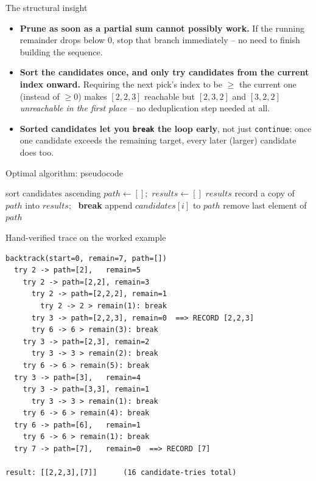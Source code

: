 \documentclass[11pt,aspectratio=169]{beamer}
\begin{document}
\begin{frame}{The structural insight}
  \begin{itemize}
    \item \textbf{Prune as soon as a partial sum cannot possibly work.} If the running
    remainder drops below $0$, stop that branch immediately -- no need to finish
    building the sequence.
    \item \textbf{Sort the candidates once, and only try candidates from the current
    index onward.} Requiring the next pick's index to be $\ge$ the current one
    (instead of $\ge 0$) makes $[2,2,3]$ reachable but $[2,3,2]$ and $[3,2,2]$
    \emph{unreachable in the first place} -- no deduplication step needed at all.
    \item \textbf{Sorted candidates let you \texttt{break} the loop early}, not just
    \texttt{continue}: once one candidate exceeds the remaining target, every later
    (larger) candidate does too.
  \end{itemize}
\end{frame}

\begin{frame}{Optimal algorithm: pseudocode}
  \footnotesize
  \begin{algorithmic}[1]
      \State sort candidates ascending
      \State $path \gets []$;\ $results \gets []$
      \State {}
      \State \Return $results$
    \EndFunction
       record a copy of $path$ into $results$;\ \Return \EndIf
         \textbf{break} \EndIf
        \State append $candidates[i]$ to $path$
        \State {} 
        \State remove last element of $path$
      \EndFor
    \EndFunction
  \end{algorithmic}
\end{frame}

\begin{frame}[fragile]{Hand-verified trace on the worked example}
  \begin{lstlisting}[style=py,numbers=none,aboveskip=0pt,belowskip=0pt]
backtrack(start=0, remain=7, path=[])
  try 2 -> path=[2],   remain=5
    try 2 -> path=[2,2], remain=3
      try 2 -> path=[2,2,2], remain=1
        try 2 -> 2 > remain(1): break
      try 3 -> path=[2,2,3], remain=0  ==> RECORD [2,2,3]
      try 6 -> 6 > remain(3): break
    try 3 -> path=[2,3], remain=2
      try 3 -> 3 > remain(2): break
    try 6 -> 6 > remain(5): break
  try 3 -> path=[3],   remain=4
    try 3 -> path=[3,3], remain=1
      try 3 -> 3 > remain(1): break
    try 6 -> 6 > remain(4): break
  try 6 -> path=[6],   remain=1
    try 6 -> 6 > remain(1): break
  try 7 -> path=[7],   remain=0  ==> RECORD [7]

result: [[2,2,3],[7]]      (16 candidate-tries total)
  \end{lstlisting}
\end{frame}
\end{document}
